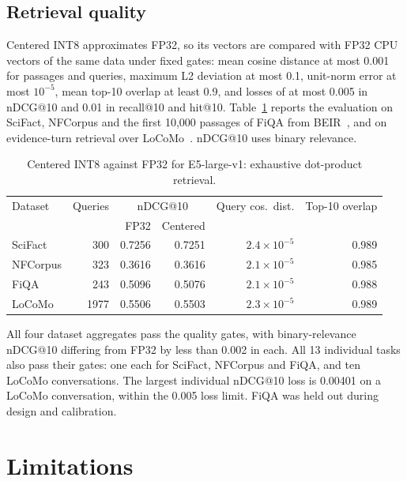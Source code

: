 \documentclass[10pt]{article}
\begin{document}
\subsection{Retrieval quality}

Centered INT8 approximates FP32, so its vectors are compared with FP32 CPU
vectors of the same data under fixed gates: mean cosine distance at most
0.001 for passages and queries, maximum L2 deviation at most 0.1, unit-norm
error at most $10^{-5}$, mean top-10 overlap at least 0.9, and losses of at
most 0.005 in nDCG@10 and 0.01 in recall@10 and hit@10. Table~\ref{tab:quality}
reports the evaluation on SciFact, NFCorpus and the first 10,000 passages of
FiQA from BEIR~\cite{thakur2021}, and on evidence-turn retrieval over
LoCoMo~\cite{maharana2024}. nDCG@10 uses binary relevance.

\begin{table}[t]
\centering
\caption{Centered INT8 against FP32 for E5-large-v1: exhaustive dot-product
retrieval.}
\label{tab:quality}
\begin{tabular}{lrrrrr}
\toprule
Dataset & Queries & \multicolumn{2}{c}{nDCG@10} & Query cos.\ dist. & Top-10 overlap \\
 & & FP32 & Centered & & \\
\midrule
SciFact & 300 & 0.7256 & 0.7251 & $2.4\times10^{-5}$ & 0.989 \\
NFCorpus & 323 & 0.3616 & 0.3616 & $2.1\times10^{-5}$ & 0.985 \\
FiQA & 243 & 0.5096 & 0.5076 & $2.1\times10^{-5}$ & 0.988 \\
LoCoMo & 1977 & 0.5506 & 0.5503 & $2.3\times10^{-5}$ & 0.989 \\
\bottomrule
\end{tabular}
\end{table}

All four dataset aggregates pass the quality gates, with binary-relevance
nDCG@10 differing from FP32 by less than 0.002 in each. All 13 individual
tasks also pass their gates: one each for SciFact, NFCorpus and FiQA, and ten
LoCoMo conversations. The largest individual nDCG@10 loss is 0.00401 on a
LoCoMo conversation, within the 0.005 loss limit. FiQA was held out during
design and calibration.

\section{Limitations}
\label{sec:limitations}
\end{document}
